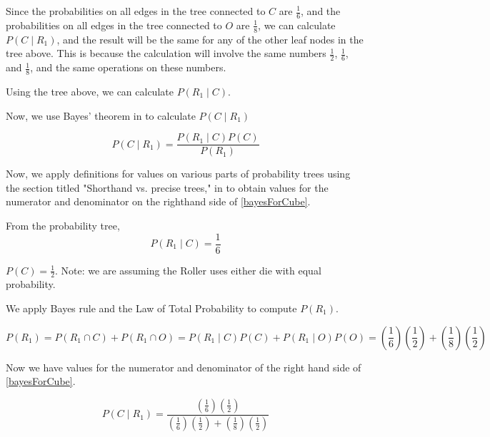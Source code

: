 \documentclass[a4paper,11pt]{article}
\begin{document}
Since the probabilities on all edges in the tree connected to $C$ are
$\frac{1}{6}$, and the probabilities on all edges in the tree connected
to $O$ are $\frac{1}{8}$, we can calculate 
$P \left( C \mid R_{1} \right)$, and the result will be the same for
any of the other leaf nodes in the tree above.  This is because the
calculation will involve the same numbers $\frac{1}{2}$, $\frac{1}{6}$,
and $\frac{1}{8}$, and the same operations on these numbers.

Using the tree above, we can calculate $P \left( R_{1} \mid C \right)$.

Now, we use Bayes' theorem in \cite{reading3} to calculate
$P \left( C \mid R_{1} \right)$

\begin{equation} \label{bayesForCube}
P \left( C \mid R_{1} \right) = 
  \frac{ P \left( R_{1} \mid C \right) P \left( C \right)}
    { P \left( R_{1} \right)}
\end{equation}

Now, we apply definitions for values on various parts of probability
trees using the section titled "Shorthand vs. precise trees," in 
\cite{reading3} to obtain values for the numerator and denominator on
the righthand side of \ref{bayesForCube}.

From the probability tree, 
\begin{equation}
P \left( R_{1} \mid C \right) = 
   \frac{1}{6}
\end{equation}

$P \left( C \right) = \frac{1}{2}$.  Note: we are assuming the Roller
uses either die with equal probability.

We apply Bayes rule \cite{reading3} and the Law of Total Probability
\cite{reading3} to compute $P \left( R_{1} \right)$.

\begin{equation}
  P \left( R_{1} \right)
    = P \left( R_{1} \cap C \right) + P \left( R_{1} \cap O \right)
    = P \left( R_{1} \mid C \right) P \left( C \right)
      + P \left( R_{1} \mid O \right) P \left( O \right)
    = \left( \frac{1}{6} \right)  \left( \frac{1}{2} \right)
      + \left( \frac{1}{8} \right)  \left( \frac{1}{2} \right)
\end{equation}

Now we have values for the numerator and denominator of the right
hand side of \ref{bayesForCube}.

\begin{equation}
P \left( C \mid R_{1} \right) = 
  \frac{ 
    \left( \frac{1}{6} \right) \left( \frac{1}{2} \right) 
    }
    {
      \left( \frac{1}{6} \right) \left( \frac{1}{2} \right) + 
        \left( \frac{1}{8} \right) \left( \frac{1}{2} \right) 
    }
\end{equation}
\end{document}
